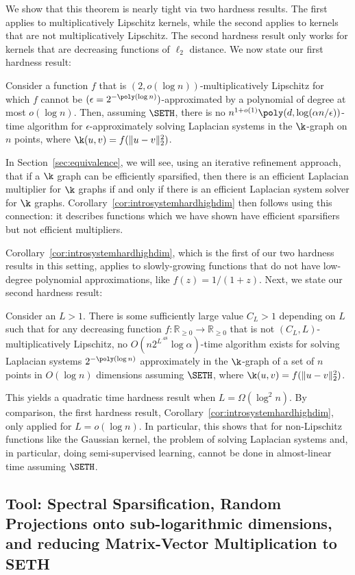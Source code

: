 We show that this theorem is nearly tight via two hardness results. The
first applies to multiplicatively Lipschitz kernels, while the second
applies to kernels that are not multiplicatively Lipschitz. The second
hardness result only works for kernels that are decreasing functions of
$\ell_2$ distance. We now state our first hardness result: 

\begin{corollary}\label{cor:introsystemhardhighdim} Consider a function
$f$ that is $(2,o(\log n))$-multiplicatively Lipschitz for which $f$
cannot be $(\epsilon=2^{-\poly(\log  n)})$-approximated by a polynomial
of degree at most $o(\log n)$. Then, assuming $\SETH$, there is no
$n^{1+o(1)} \poly(d, \log(\alpha n/\epsilon))$-time algorithm for
$\epsilon$-approximately solving Laplacian systems in the $\k$-graph on
$n$ points, where $\k(u,v) = f(\|u-v\|_2^2)$.  \end{corollary}
In
Section~\ref{sec:equivalence}, we will see, using an iterative
refinement approach, that if a $\k$ graph can be efficiently sparsified,
           then there is an efficient Laplacian multiplier for $\k$
           graphs if and only if there is an efficient Laplacian system
           solver for $\k$ graphs.
           Corollary~\ref{cor:introsystemhardhighdim} then follows using
           this connection: it describes functions which we have shown
           have efficient sparsifiers but not efficient multipliers.

Corollary~\ref{cor:introsystemhardhighdim}, which is the first of our
two hardness results in this setting, applies to slowly-growing
functions that do not have low-degree polynomial approximations, like
$f(z) = 1/(1 + z)$. Next, we state our second hardness result:

\begin{theorem}\label{thm:informal-high-lsolve-hard}
Consider an $L > 1$. There is some sufficiently large value $C_L > 1$
depending on $L$ such that for any decreasing function
$f:\mathbb{R}_{\ge 0}\rightarrow \mathbb{R}_{\ge 0}$ that is not
$(C_L,L)$-multiplicatively Lipschitz, no $O(n  2^{L^{.48}} \log
    \alpha)$-time algorithm exists for solving Laplacian systems
$2^{-\poly(\log n)}$ approximately in the $\k$-graph of a set of $n$
points in $O(\log n)$ dimensions assuming $\SETH$, where $\k(u,v) =
f(\|u-v\|_2^2)$.  \end{theorem}

This yields a quadratic time hardness result when $L = \Omega(\log^2
    n)$. By comparison, the first hardness result,
     Corollary~\ref{cor:introsystemhardhighdim}, only applied for $L =
     o(\log n)$. In particular, this shows that for non-Lipschitz
     functions like the Gaussian kernel, the problem of solving
     Laplacian systems and, in particular, doing semi-supervised
     learning, cannot be done in almost-linear time assuming $\SETH$.

\subsection{Tool: Spectral Sparsification, Random Projections onto
  sub-logarithmic dimensions, and reducing Matrix-Vector Multiplication
    to SETH}
